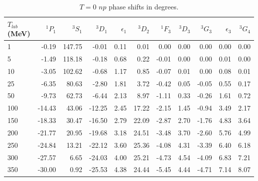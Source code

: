 \begin{table}
\caption{$T=0$ $np$ phase shifts in degrees.}
\begin{tabular}{lrrrrrrrrrr}
 $T_{lab}$ (MeV)
 & $^1P_1$
 & $^3S_1$
 & $^3D_1$
 & $\epsilon_1$
 & $^3D_2$
 & $^1F_3$
 & $^3D_3$
 & $^3G_3$
 & $\epsilon_3$
 & $^3G_4$
\\
 \hline 
    1 &  -0.19 & 147.75 &  -0.01 &   0.11 &   0.01 &   0.00 &   0.00 &   0.00 &   0.00 &   0.00 \\
    5 &  -1.49 & 118.18 &  -0.18 &   0.68 &   0.22 &  -0.01 &   0.00 &   0.00 &   0.01 &   0.00 \\
   10 &  -3.05 & 102.62 &  -0.68 &   1.17 &   0.85 &  -0.07 &   0.01 &   0.00 &   0.08 &   0.01 \\
   25 &  -6.35 &  80.63 &  -2.80 &   1.81 &   3.72 &  -0.42 &   0.05 &  -0.05 &   0.55 &   0.17 \\
   50 &  -9.73 &  62.73 &  -6.44 &   2.13 &   8.97 &  -1.11 &   0.33 &  -0.26 &   1.61 &   0.72 \\
  100 & -14.43 &  43.06 & -12.25 &   2.45 &  17.22 &  -2.15 &   1.45 &  -0.94 &   3.49 &   2.17 \\
  150 & -18.33 &  30.47 & -16.50 &   2.79 &  22.09 &  -2.87 &   2.70 &  -1.76 &   4.83 &   3.64 \\
  200 & -21.77 &  20.95 & -19.68 &   3.18 &  24.51 &  -3.48 &   3.70 &  -2.60 &   5.76 &   4.99 \\
  250 & -24.84 &  13.21 & -22.12 &   3.60 &  25.36 &  -4.08 &   4.31 &  -3.39 &   6.40 &   6.18 \\
  300 & -27.57 &   6.65 & -24.03 &   4.00 &  25.21 &  -4.73 &   4.54 &  -4.09 &   6.83 &   7.21 \\
  350 & -30.00 &   0.92 & -25.53 &   4.38 &  24.44 &  -5.45 &   4.44 &  -4.71 &   7.14 &   8.07 \\
\end{tabular}
\label{tab_phnp0}
\end{table}



\pagebreak


